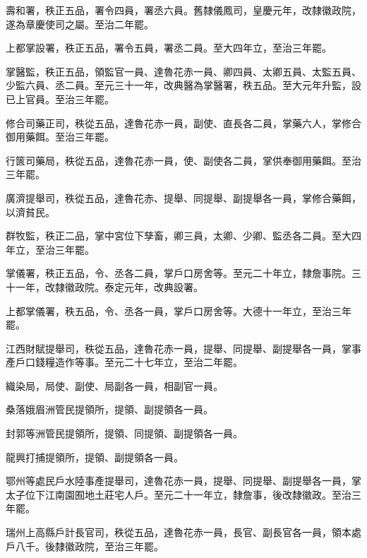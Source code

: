\begin{pinyinscope}
 壽和署，秩正五品，署令四員，署丞六員。舊隸儀鳳司，皇慶元年，改隸徽政院，遂為章慶使司之屬。至治二年罷。



 上都掌設署，秩正五品，署令五員，署丞二員。至大四年立，至治三年罷。



 掌醫監，秩正五品，領監官一員、達魯花赤一員、卿四員、太卿五員、太監五員、少監六員、丞二員。至元三十一年，改典醫為掌醫署，秩五品。至大元年升監，設已上官員。至治三年罷。



 修合司藥正司，秩從五品，達魯花赤一員，副使、直長各二員，掌藥六人，掌修合御用藥餌。至治三年罷。



 行篋司藥局，秩從五品，達魯花赤一員，使、副使各二員，掌供奉御用藥餌。至治三年罷。



 廣濟提舉司，秩從五品，達魯花赤、提舉、同提舉、副提舉各一員，掌修合藥餌，以濟貧民。



 群牧監，秩正二品，掌中宮位下孳畜，卿三員，太卿、少卿、監丞各二員。至大四年立，至治三年罷。



 掌儀署，秩正五品，令、丞各二員，掌戶口房舍等。至元二十年立，隸詹事院。三十一年，改隸徽政院。泰定元年，改典設署。



 上都掌儀署，秩五品，令、丞各一員，掌戶口房舍等。大德十一年立，至治三年罷。



 江西財賦提舉司，秩從五品，達魯花赤一員，提舉、同提舉、副提舉各一員，掌事產戶口錢糧造作等事。至元二十七年立，至治二年罷。



 織染局，局使、副使、局副各一員，相副官一員。



 桑落娥眉洲管民提領所，提領、副提領各一員。



 封郭等洲管民提領所，提領、同提領、副提領各一員。



 龍興打捕提領所，提領、副提領各一員。



 鄂州等處民戶水陸事產提舉司，達魯花赤一員，提舉、同提舉、副提舉各一員，掌太子位下江南園囿地土莊宅人戶。至元二十一年立，隸詹事，後改隸徽政。至治三年罷。



 瑞州上高縣戶計長官司，秩從五品，達魯花赤一員，長官、副長官各一員，領本處戶八千。後隸徽政院，至治三年罷。




\end{pinyinscope}
